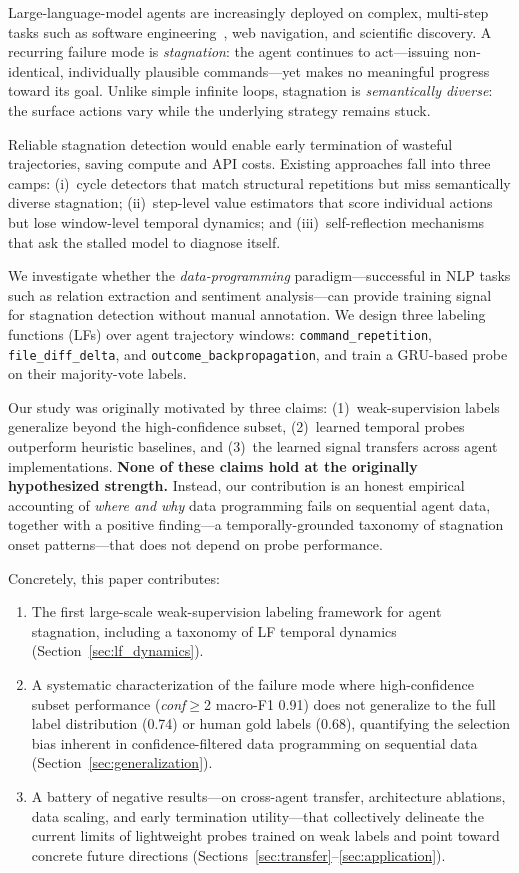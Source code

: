 \documentclass[11pt]{article}
\begin{document}
Large-language-model agents are increasingly deployed on complex, multi-step tasks such as software engineering~\citep{yang2024swebench,wang2024opendevin}, web navigation, and scientific discovery.
A recurring failure mode is \emph{stagnation}: the agent continues to act---issuing non-identical, individually plausible commands---yet makes no meaningful progress toward its goal.
Unlike simple infinite loops, stagnation is \emph{semantically diverse}: the surface actions vary while the underlying strategy remains stuck.

Reliable stagnation detection would enable early termination of wasteful trajectories, saving compute and API costs.
Existing approaches fall into three camps:
(i)~cycle detectors that match structural repetitions but miss semantically diverse stagnation;
(ii)~step-level value estimators that score individual actions but lose window-level temporal dynamics;
and (iii)~self-reflection mechanisms that ask the stalled model to diagnose itself.

We investigate whether the \emph{data-programming} paradigm---successful in NLP tasks such as relation extraction and sentiment analysis---can provide training signal for stagnation detection without manual annotation.
We design three labeling functions (LFs) over agent trajectory windows: \texttt{command\_repetition}, \texttt{file\_diff\_delta}, and \texttt{outcome\_backpropagation}, and train a GRU-based probe on their majority-vote labels.

Our study was originally motivated by three claims: (1)~weak-supervision labels generalize beyond the high-confidence subset, (2)~learned temporal probes outperform heuristic baselines, and (3)~the learned signal transfers across agent implementations.
\textbf{None of these claims hold at the originally hypothesized strength.}
Instead, our contribution is an honest empirical accounting of \emph{where and why} data programming fails on sequential agent data, together with a positive finding---a temporally-grounded taxonomy of stagnation onset patterns---that does not depend on probe performance.

Concretely, this paper contributes:
\begin{enumerate}
\item The first large-scale weak-supervision labeling framework for agent stagnation, including a taxonomy of LF temporal dynamics (Section~\ref{sec:lf_dynamics}).
\item A systematic characterization of the failure mode where high-confidence subset performance (\emph{conf}$\geq$2 macro-F1 0.91) does not generalize to the full label distribution (0.74) or human gold labels (0.68), quantifying the selection bias inherent in confidence-filtered data programming on sequential data (Section~\ref{sec:generalization}).
\item A battery of negative results---on cross-agent transfer, architecture ablations, data scaling, and early termination utility---that collectively delineate the current limits of lightweight probes trained on weak labels and point toward concrete future directions (Sections~\ref{sec:transfer}--\ref{sec:application}).
\end{enumerate}
\end{document}
